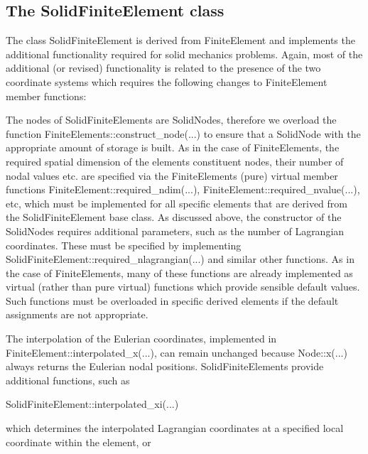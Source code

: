 \hypertarget{index_solid_fe}{}\subsection{The Solid\+Finite\+Element class}\label{index_solid_fe}
The class {\ttfamily Solid\+Finite\+Element} is derived from {\ttfamily Finite\+Element} and implements the additional functionality required for solid mechanics problems. Again, most of the additional (or revised) functionality is related to the presence of the two coordinate systems which requires the following changes to {\ttfamily Finite\+Element} member functions\+:
\begin{DoxyItemize}
\item The nodes of {\ttfamily Solid\+Finite\+Elements} are {\ttfamily Solid\+Nodes}, therefore we overload the function {\ttfamily Finite\+Elements\+::construct\+\_\+node}(...) to ensure that a {\ttfamily Solid\+Node} with the appropriate amount of storage is built. As in the case of {\ttfamily Finite\+Elements}, the required spatial dimension of the elements\textquotesingle{} constituent nodes, their number of nodal values etc. are specified via the {\ttfamily Finite\+Element\textquotesingle{}s} (pure) virtual member functions {\ttfamily Finite\+Element\+::required\+\_\+ndim}(...), {\ttfamily Finite\+Element\+::required\+\_\+nvalue}(...), etc, which must be implemented for all specific elements that are derived from the {\ttfamily Solid\+Finite\+Element} base class. As discussed above, the constructor of the {\ttfamily Solid\+Nodes} requires additional parameters, such as the number of Lagrangian coordinates. These must be specified by implementing {\ttfamily Solid\+Finite\+Element\+::required\+\_\+nlagrangian}(...) and similar other functions. As in the case of {\ttfamily Finite\+Elements}, many of these functions are already implemented as virtual (rather than pure virtual) functions which provide sensible default values. Such functions must be overloaded in specific derived elements if the default assignments are not appropriate.
\item The interpolation of the Eulerian coordinates, implemented in {\ttfamily Finite\+Element\+::interpolated\+\_\+x}(...), can remain unchanged because {\ttfamily Node\+::x}(...) always returns the Eulerian nodal positions. {\ttfamily Solid\+Finite\+Elements} provide additional functions, such as 
\begin{DoxyCode}
SolidFiniteElement::interpolated\_xi(...)
\end{DoxyCode}
 which determines the interpolated Lagrangian coordinates at a specified local coordinate within the element, or 

\end{DoxyItemize}
